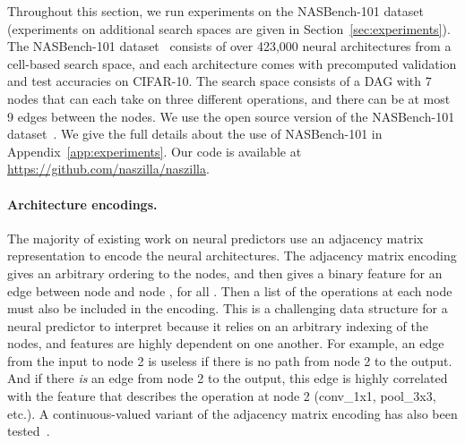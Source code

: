 \documentclass[11pt]{article}
\numberwithin{equation}{section}
\numberwithin{figure}{section}
\theoremstyle{plain}
\theoremstyle{definition}
\let\citep\cite
\begin{document}
Throughout this section, we run experiments on the NASBench-101 dataset
(experiments on additional search spaces are given in Section~\ref{sec:experiments}).
The NASBench-101 dataset~\citep{nasbench} consists of over 423,000 
neural architectures from a cell-based search space,
and each architecture comes with precomputed validation 
and test accuracies on CIFAR-10. 
The search space consists of a DAG with 7 nodes
that can each take on three different operations, and there can
be at most 9 edges between the nodes. 
We use the open source version of the NASBench-101 dataset~\cite{nasbench}.
We give the full details about the use of NASBench-101 in
Appendix~\ref{app:experiments}. Our code is available at
\url{https://github.com/naszilla/naszilla}.





\paragraph{Architecture encodings.}
The majority of existing work on neural predictors use an adjacency
matrix representation to encode the neural architectures.
The adjacency matrix encoding gives an arbitrary ordering to the nodes, 
and then gives a binary feature for an edge between node  and node , 
for all . 
Then a list of the operations at each node must also be included in the encoding.
This is a challenging data structure for a neural predictor to interpret 
because it relies on an arbitrary indexing of the nodes, and features are 
highly dependent on one another. For example, an edge from the input to node 2 
is useless if there is no path from node 2 to the output.
And if there \emph{is} an edge from node 2 to the output, this edge is highly
correlated with the feature that describes the operation at node 2 
(conv\_1x1, pool\_3x3, etc.).
A continuous-valued variant of the adjacency matrix encoding has also 
been tested~\cite{nasbench}.
\end{document}
